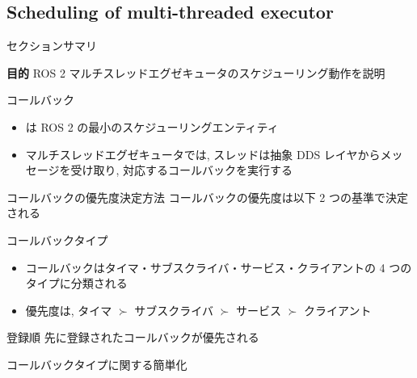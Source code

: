 \subsection{Scheduling of multi-threaded executor}
\label{ssec: scheduling_of_multi_threaded_executor}

\begin{frame}{セクションサマリ}
    \begin{itembox}[l]{\textbf{目的}}
        ROS 2 マルチスレッドエグゼキュータのスケジューリング動作を説明
    \end{itembox}
\end{frame}

\begin{frame}{コールバック}
    \begin{itemize}
        \item {}は ROS 2 の最小のスケジューリングエンティティ
        \item マルチスレッドエグゼキュータでは, スレッドは抽象 DDS レイヤからメッセージを受け取り, 対応するコールバックを実行する
    \end{itemize}
\end{frame}

\begin{frame}{コールバックの優先度決定方法}
    コールバックの優先度は以下 2 つの基準で決定される

    \begin{block}{コールバックタイプ}
        \setlength{\linewidth}{0.98\columnwidth}
        \begin{itemize}
            \item コールバックはタイマ・サブスクライバ・サービス・クライアントの 4 つのタイプに分類される
            \item 優先度は, タイマ $\succ$ サブスクライバ $\succ$ サービス $\succ$ クライアント 
        \end{itemize}
    \end{block}

    \begin{block}{登録順}
        先に登録されたコールバックが優先される
    \end{block}
\end{frame}

\begin{frame}{コールバックタイプに関する簡単化}
\end{frame}

